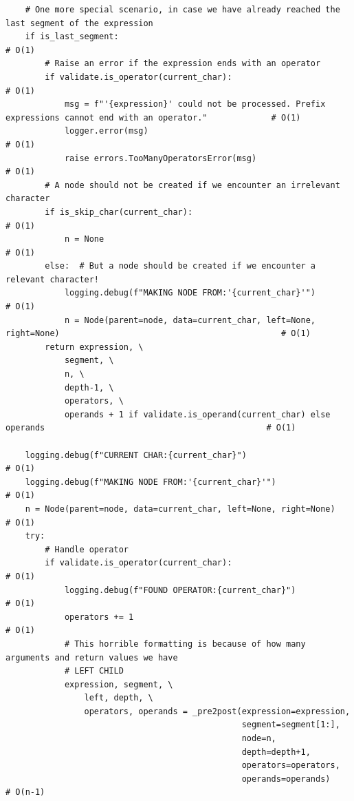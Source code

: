 \documentclass[10pt,letterpaper,final]{report}
\begin{document}
\begin{verbatim}
    # One more special scenario, in case we have already reached the last segment of the expression
    if is_last_segment:                                                                                                 # O(1)
        # Raise an error if the expression ends with an operator
        if validate.is_operator(current_char):                                                                          # O(1)
            msg = f"'{expression}' could not be processed. Prefix expressions cannot end with an operator."             # O(1)
            logger.error(msg)                                                                                           # O(1)
            raise errors.TooManyOperatorsError(msg)                                                                     # O(1)
        # A node should not be created if we encounter an irrelevant character
        if is_skip_char(current_char):                                                                                  # O(1)
            n = None                                                                                                    # O(1)
        else:  # But a node should be created if we encounter a relevant character!
            logging.debug(f"MAKING NODE FROM:'{current_char}'")                                                         # O(1)
            n = Node(parent=node, data=current_char, left=None, right=None)                                             # O(1)
        return expression, \
            segment, \
            n, \
            depth-1, \
            operators, \
            operands + 1 if validate.is_operand(current_char) else operands                                             # O(1)

    logging.debug(f"CURRENT CHAR:{current_char}")                                                                       # O(1)
    logging.debug(f"MAKING NODE FROM:'{current_char}'")                                                                 # O(1)
    n = Node(parent=node, data=current_char, left=None, right=None)                                                     # O(1)
    try:
        # Handle operator
        if validate.is_operator(current_char):                                                                          # O(1)
            logging.debug(f"FOUND OPERATOR:{current_char}")                                                             # O(1)
            operators += 1                                                                                              # O(1)
            # This horrible formatting is because of how many arguments and return values we have
            # LEFT CHILD
            expression, segment, \
                left, depth, \
                operators, operands = _pre2post(expression=expression,
                                                segment=segment[1:],
                                                node=n,
                                                depth=depth+1,
                                                operators=operators,
                                                operands=operands)                                                      # O(n-1)


\end{verbatim}
\end{document}
